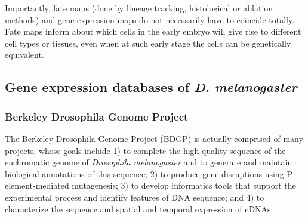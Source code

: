 \begin{mdframed}[style=boxstyle,frametitle={Box1. Fate maps and gene expression maps }]

Importantly, fate maps (done by lineage tracking, histological or ablation methods) and gene expression maps do not necessarily have to coincide totally. Fate maps inform about which cells in the early embryo will give rise to different cell types or tissues, even when at such early stage the cells can be genetically equivalent.

\end{mdframed}


\subsection{Gene expression databases of \textit{D. melanogaster}}
\label{Intro_BDGP}

\subsubsection{Berkeley Drosophila Genome Project}

The Berkeley Drosophila Genome Project (BDGP) is actually comprised of many projects, whose goals include 1) to complete the high quality sequence of the euchromatic genome of \textit{Drosophila melanogaster} and to generate and maintain biological annotations of this sequence; 2) to produce gene disruptions using P element-mediated mutagenesis; 3) to develop informatics tools that support the experimental process and identify features of DNA sequence; and 4) to characterize the sequence and spatial and temporal expression of cDNAs.


